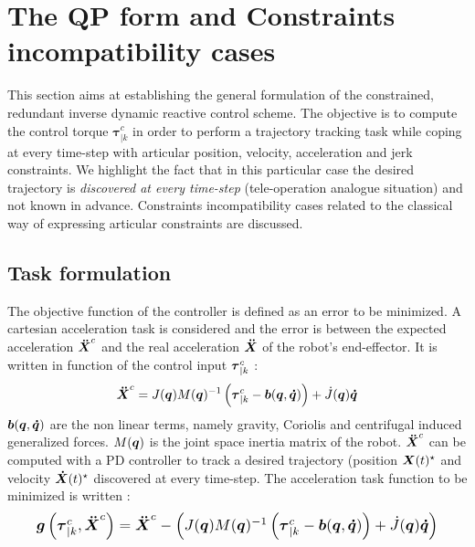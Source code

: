 \documentclass[a4paper, 10pt, conference]{ieeeconf}      %
\newcommand{\vect}[1]{\mbox{\boldmath${#1}$}}%
\begin{document}
\section{The QP form and Constraints incompatibility cases}
This section aims at establishing the general formulation of the constrained, redundant inverse dynamic reactive control scheme. The objective is to compute the control torque $\boldsymbol{\tau}_{|k}^{c}$ in order to perform a trajectory tracking task while coping at every time-step with articular position, velocity, acceleration and jerk constraints. We highlight the fact that in this particular case the desired trajectory is \textit{discovered at every time-step} (tele-operation analogue situation) and not known in advance. Constraints incompatibility cases related to the classical way of expressing articular constraints are discussed. 


\subsection{Task formulation}

The objective function of the controller is defined as an error to be minimized. A cartesian acceleration task is considered and the error is between the expected acceleration $\vect{\ddot{X}}^c$ and the real acceleration $\vect{\ddot{X}}$ of the robot's end-effector. It is written in function of the control input $\vect{\tau}_{|k}^{c}$ :
\begin{equation}
 \vect{\ddot{X}}^{c} = J(\vect{q}) M(\vect{q})^{-1} \left(\boldsymbol{\tau}_{|k}^{c} - \vect{b}(\vect{q},\vect{\dot{q}})\right) + \dot{J}(\vect{q}) \vect{\dot{q}}
\label{Xddot}
\end{equation}
$\vect{b}(\vect{q},\vect{\dot{q}})$ are the non linear terms, namely gravity, Coriolis and centrifugal induced generalized forces. $M(\vect{q})$ is the joint space inertia matrix of the robot. $\vect{\ddot{X}}^c$ can be computed with a PD controller to track a desired trajectory (position $\vect{X}(t)^\star$ and velocity  $\vect{\dot{X}}(t)^\star$ discovered at every time-step. The acceleration task function to be minimized is written :
\hspace{-2mm}
\begin{equation}
\resizebox{.911\hsize}{!}{$\vect{g}\left(\boldsymbol{\tau}_{|k}^{c},\vect{\ddot{X}}^c\right) =  \vect{\ddot{X}}^c - \left(J(\vect{q}) M(\vect{q})^{-1} \left(\boldsymbol{\tau}_{|k}^{c} - \vect{b}(\vect{q},\vect{\dot{q}}) \right) + \dot{J}(\vect{q}) \vect{\dot{q}}\right)$}
\label{accelerationError}
\end{equation}
\end{document}
